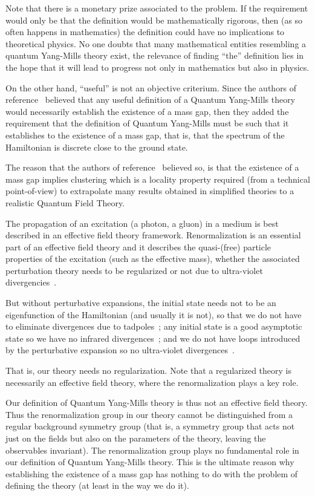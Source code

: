 \documentclass[11pt]{book}
\begin{document}
Note that there is a monetary prize associated to the problem. If the
requirement would only be that the definition would be mathematically
rigorous, then (as so often happens in mathematics) the definition could
have no implications to theoretical physics. No one doubts that many
mathematical entities resembling a quantum Yang-Mills theory exist, the
relevance of finding ``the'' definition lies in the hope that it will
lead to progress not only in mathematics but also in physics.

On the other hand, ``useful'' is not an objective criterium. Since the
authors of reference~\cite{Jaffe2006Quantum} believed that any useful definition of a Quantum
Yang-Mills theory would necessarily establish the existence of a mass
gap, then they added the requirement that the definition of Quantum
Yang-Mills must be such that it establishes to the existence of a mass
gap, that is, that the spectrum of the Hamiltonian is discrete close to
the ground state.

The reason that the authors of
reference~\cite{Jaffe2006Quantum} believed so, is that the existence of a mass gap implies
clustering which is a locality property required (from a technical
point-of-view) to extrapolate many results obtained in simplified
theories to a realistic Quantum Field Theory.

The propagation of an excitation (a photon, a gluon) in a medium is best
described in an effective field theory
framework\cite{Schwenk2012Renormalization}. Renormalization is an essential part of an effective
field theory and it describes the quasi-(free) particle properties of
the excitation (such as the effective mass), whether the associated
perturbation theory needs to be regularized or not due to ultra-violet
divergencies~\cite{Weinberg1995quantum}.

But without perturbative expansions, the initial state needs not to be
an eigenfunction of the Hamiltonian (and usually it is not), so that we
do not have to eliminate divergences due to
tadpoles~\cite{Ellis2016Complete}; any initial state is a good asymptotic state so we
have no infrared
divergences~\cite{Aste2010Regularization}; and we do not have loops introduced by the
perturbative expansion so no ultra-violet
divergences~\cite{Aste2010Regularization}.

That is, our theory needs no regularization. Note that a regularized
theory is necessarily an effective field theory, where the
renormalization plays a key role.

Our definition of Quantum Yang-Mills theory is thus not an effective
field theory. Thus the renormalization group in our theory cannot be
distinguished from a regular background symmetry group (that is, a
symmetry group that acts not just on the fields but also on the
parameters of the theory, leaving the observables invariant). The
renormalization group plays no fundamental role in our definition of
Quantum Yang-Mills theory. This is the ultimate reason why establishing
the existence of a mass gap has nothing to do with the problem of
defining the theory (at least in the way we do it).
\end{document}
